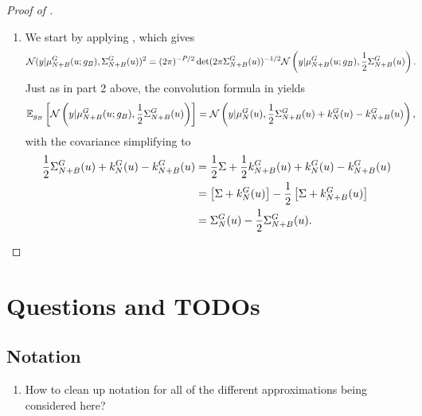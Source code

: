 \documentclass[12pt]{article}
\begin{document}
\begin{proof} [Proof of ]
\begin{enumerate}
\item We start by applying , which gives 
\begin{align*}
\Gaussian(\obs | \emMean[\Naugment]{\fwd}(\Par; \designBatchFwd), \CovComb[\Naugment](\Par))^2
&= (2\pi)^{-\dimObs/2} \det(2\pi \CovComb[\Naugment](\Par))^{-1/2} 
\Gaussian\left(\obs | \emMean[\Naugment]{\fwd}(\Par; \designBatchFwd), \frac{1}{2}\CovComb[\Naugment](\Par)\right). 
\end{align*}
Just as in part 2 above, the convolution formula in  yields 
\begin{align*}
\E_{\designBatchFwd}\left[\Gaussian\left(\obs | \emMean[\Naugment]{\fwd}(\Par; \designBatchFwd), \frac{1}{2}\CovComb[\Naugment](\Par)\right) \right] 
&= \Gaussian\left(\obs | \emMean[\Ndesign]{\fwd}(\Par), \frac{1}{2}\CovComb[\Naugment](\Par) + \emKer[\Ndesign]{\fwd}(\Par) - \emKer[\Naugment]{\fwd}(\Par)\right), 
\end{align*}
with the covariance simplifying to 
\begin{align*}
\frac{1}{2}\CovComb[\Naugment](\Par) + \emKer[\Ndesign]{\fwd}(\Par) - \emKer[\Naugment]{\fwd}(\Par)
&= \frac{1}{2}\likPar + \frac{1}{2}\emKer[\Naugment]{\fwd}(\Par) + \emKer[\Ndesign]{\fwd}(\Par) - \emKer[\Naugment]{\fwd}(\Par) \\ 
&= \left[\likPar + \emKer[\Ndesign]{\fwd}(\Par) \right] - \frac{1}{2}\left[\likPar + \emKer[\Naugment]{\fwd}(\Par) \right] \\
&= \CovComb[\Ndesign](\Par) - \frac{1}{2} \CovComb[\Naugment](\Par). 
\end{align*}
 
\end{enumerate}

\end{proof}




\section{Questions and TODOs}
\subsection{Notation}
\begin{enumerate}
\item How to clean up notation for all of the different approximations being considered here? 
\end{enumerate}
\end{document}
